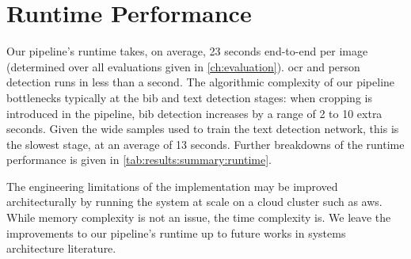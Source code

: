 \section{Runtime Performance}

Our pipeline's runtime takes, on average, 23 seconds end-to-end per image (determined over all evaluations given in \cref{ch:evaluation}). \gls{ocr} and person detection runs in less than a second. The algorithmic complexity of our pipeline bottlenecks typically at the bib and text detection stages: when cropping is introduced in the pipeline, bib detection increases by a range of 2 to 10 extra seconds. Given the wide samples used to train the text detection network, this is the slowest stage, at an average of 13 seconds. Further breakdowns of the runtime performance is given in \cref{tab:results:summary:runtime}.

The engineering limitations of the \frcnn{} implementation may be improved architecturally by running the system at scale on a cloud cluster such as \gls{aws}. While memory complexity is not an issue, the time complexity is. We leave the improvements to our pipeline's runtime up to future works in systems architecture literature.


